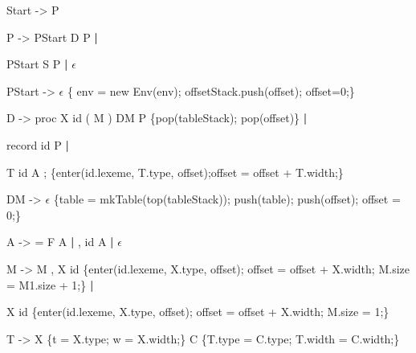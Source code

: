 \documentclass{ML}
\begin{document}
\begin{enumerate}
    {\unicodefont \footnotesize
    \item Start -> P 
    \vspace{0.5cm}
    
    \item P -> PStart D P \textbf{|}
    
    \hspace{1cm}PStart S P \textbf{|} $\epsilon$
    
    \vspace{0.5cm}
    
    \item PStart -> $\epsilon$ {\color{red}\{ env = new Env(env); offsetStack.push(offset); offset=0;\}}
    \vspace{0.5cm}
    
    \item D -> proc X id ( M ) DM { P } {\color{red}\{pop(tableStack); pop(offset)\}} \textbf{|}
    
    \hspace{1cm} record id { P } \textbf{|}
    
    \hspace{1cm} T id A ; {\color{red}\{enter(id.lexeme, T.type, offset);offset = offset + T.width;\}}
        \vspace{0.5cm}
    
    \item DM -> $\epsilon$ {\color{red}\{table = mkTable(top(tableStack)); push(table); push(offset); offset = 0;\}}
    \vspace{0.1cm}
    
    \item A -> = F A \textbf{|} , id A \textbf{|} $\epsilon$
    \vspace{0.5cm}
    
    \item M -> M , X id {\color{red}\{enter(id.lexeme, X.type, offset); offset = offset + X.width; M.size = M1.size + 1;\}} \textbf{|} 
    
    \hspace{0.5cm}X id {\color{red}\{enter(id.lexeme, X.type, offset); offset = offset + X.width; M.size = 1;\}}
    \vspace{0.1cm}
    
    \item T -> X {\color{red}\{t = X.type; w = X.width;\}} C {\color{red}\{T.type = C.type; T.width = C.width;\}}
    \vspace{0.5cm}
    
}
\end{enumerate}
\end{document}
